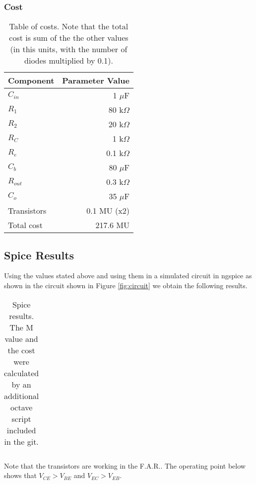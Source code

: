 \subsubsection{Cost}
\begin{table}[h]
  \centering
  \begin{tabular}{|l|r|}
    \hline    
    Component & Parameter Value \\
    \hline
    $C_{in}$ & 1 $\mu$F \\
    \hline
    $R_{1}$ & 80 k$\Omega$ \\
    \hline
    $R_{2}$ & 20 k$\Omega$ \\
    \hline
    $R_{C}$ & 1 k$\Omega$ \\
    \hline
    $R_{e}$ & 0.1 k$\Omega$ \\
    \hline
    $C_{b}$ & 80 $\mu$F \\
    \hline
    $R_{out}$ & 0.3 k$\Omega$ \\
    \hline
    $C_{o}$ & 35 $\mu$F \\
    \hline
    Transistors & 0.1 MU (x2) \\
    \hline
    Total cost & 217.6 MU \\
    \hline
  \end{tabular}
  \caption{Table of costs. Note that the total cost is sum of the the other values (in this units, with the number of diodes multiplied by 0.1).}
  \label{tab:components}
\end{table}

\subsection{Spice Results}
 Using the values stated above and using them in a simulated circuit in ngspice as shown in the circuit shown in Figure \ref{fig:circuit} we obtain the following results.
 

\begin{table}[h]
  \centering
  \begin{tabular}{|l|r|}
    \hline    
    
  \end{tabular}
  \caption{Spice results. The M value and the cost were calculated by an additional octave script included in the git.}
  \label{tab:ngspice results}
\end{table}

Note that the transistors are working in the F.A.R.. The operating point below shows that $V_{CE} > V_{BE}$ and $V_{EC} > V_{EB}$.

\vspace{1cm}
\indent
{}
\label{tab:V1}
\vspace{1cm}
\label{tab:V2}

\vspace{1cm} 

